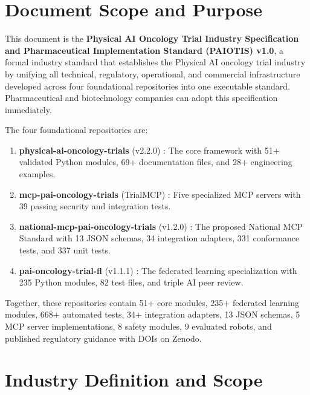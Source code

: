 \documentclass[11pt,letterpaper]{article}
\begin{document}
\section*{Document Scope and Purpose}

This document is the \textbf{Physical AI Oncology Trial Industry Specification and Pharmaceutical Implementation Standard (PAIOTIS) v1.0}, a formal industry standard that establishes the Physical AI oncology trial industry by unifying all technical, regulatory, operational, and commercial infrastructure developed across four foundational repositories into one executable standard. Pharmaceutical and biotechnology companies can adopt this specification immediately.

The four foundational repositories are:
\begin{enumerate}
  \item \textbf{physical-ai-oncology-trials} (v2.2.0) \cite{kawchak2026repo}: The core framework with 51+ validated Python modules, 69+ documentation files, and 28+ engineering examples.
  \item \textbf{mcp-pai-oncology-trials} (TrialMCP) \cite{kawchak2026mcp}: Five specialized MCP servers with 39 passing security and integration tests.
  \item \textbf{national-mcp-pai-oncology-trials} (v1.2.0) \cite{kawchak2026nationalmcp}: The proposed National MCP Standard with 13 JSON schemas, 34 integration adapters, 331 conformance tests, and 337 unit tests.
  \item \textbf{pai-oncology-trial-fl} (v1.1.1) \cite{kawchak2026fl}: The federated learning specialization with 235 Python modules, 82 test files, and triple AI peer review.
\end{enumerate}

Together, these repositories contain 51+ core modules, 235+ federated learning modules, 668+ automated tests, 34+ integration adapters, 13 JSON schemas, 5 MCP server implementations, 8 safety modules, 9 evaluated robots, and published regulatory guidance with DOIs on Zenodo.

\section{Industry Definition and Scope}
\label{sec:part1}
\end{document}
